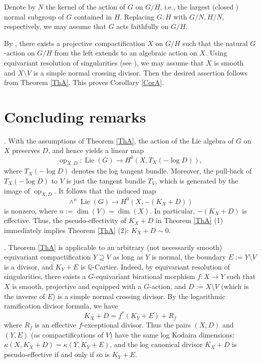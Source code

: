 \documentclass[12pt,a4paper]{amsart}
\theoremstyle{plain}
\theoremstyle{definition}
\theoremstyle{remark}
\begin{document}
Denote by $N$ the kernel of the action of $G$ on $G/H$, i.e., the
largest (closed ) normal subgroup of $G$ contained in $H$.
Replacing $G,H$ with $G/N, H/N$, respectively, we may assume that
$G$ acts faithfully on $G/H$.

By \cite[Thm.~2]{Br10}, there exists a projective compactification
$X$ on $G/H$ such that the natural $G$-action on $G/H$ from the left
extends to an
algebraic action on $X$. Using equivariant resolution of singularities
(see \cite{Ko07}), we may assume that $X$ is smooth and
$X \setminus V$ is a simple normal crossing divisor. Then the desired
assertion follows from Theorem \ref{ThA}.
This proves Corollary \ref{CorA}.

\section{Concluding remarks}

. With the assumptions of Theorem \ref{ThA}, the action of the Lie
algebra of $G$ on $X$ preserves $D$, and hence yields a linear map
\[ {\operatorname{op}}_{X,D} : {\operatorname{Lie}}(G) \longrightarrow H^0(X,T_X(- \log D)), \]
where $T_X(- \log D)$ denotes the log tangent bundle. Moreover, the
pull-back of $T_X(- \log D)$ to $V$ is just the tangent bundle $T_V$,
which is generated by the image of ${\operatorname{op}}_{X,D}$. It follows that
the induced map
\[ \wedge^n {\operatorname{Lie}}(G) \longrightarrow H^0(X, -(K_X + D)) \]
is nonzero, where $n := \dim(V) = \dim(X)$. In particular,
$-(K_X + D)$ is effective. Thus, the pseudo-effectivity
of $K_X + D$ in Theorem \ref{ThA} (1) immediately implies
Theorem \ref{ThA} (2): $K_X + D \sim 0$.

\medskip

.
Theorem \ref{ThA} is applicable to an arbitrary (not necessarily smooth)
equivariant compactification $Y \supseteq V$ as long as $Y$ is normal,
the boundary $E:= Y \setminus V$ is a divisor, and $K_Y + E$ is ${\mathbb{Q}}$-Cartier.
Indeed, by equivariant resolution of singularities, there exists a
$G$-equivariant birational morphism $f : X \to Y$ such that $X$ is smooth,
projective and equipped with a $G$-action, and $D := X \setminus V$
(which is the inverse of $E$) is a simple normal crossing divisor.
By the logarithmic ramification divisor formula, we have
$$K_X + D = f^*(K_Y + E) + R_f$$
where $R_f$ is an effective $f$-exceptional
divisor. Thus the pairs $(X, D)$ and $(Y, E)$
(as compactifications of $V$) have the same log Kodaira dimensions:
$\kappa(X, K_X + D) = \kappa(Y, K_Y + E)$,
and the log canonical divisor $K_X + D$ is pseudo-effective if and only if
so is $K_Y + E$.
\end{document}
